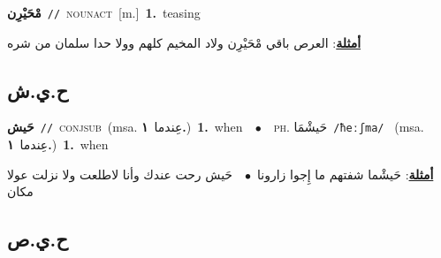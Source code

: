 \documentclass[10pt,a4paper,twoside]{article} %
\begin{document}
\begin{multicols}{2}
{\setlength\topsep{0pt}\textbf{\foreignlanguage{arabic}{مْحَيْرِن}}\ {\color{gray}\texttt{//}\color{black}}\ \textsc{noun\textunderscore act}\ [m.]\ \textbf{1.}~teasing\  \begin{flushright}\color{gray}\foreignlanguage{arabic}{\textbf{\underline{\foreignlanguage{arabic}{أمثلة}}}: العرص باقي مْحَيْرِن ولاد المخيم كلهم وولا حدا سلمان من شره}\end{flushright}\color{black}} \vspace{2mm}

\vspace{-3mm}
\subsection*{\color{blue}\foreignlanguage{arabic}{ح.ي.ش}\color{blue}{}} 

{\setlength\topsep{0pt}\textbf{\foreignlanguage{arabic}{حَيش}}\ {\color{gray}\texttt{//}\color{black}}\ \textsc{conj\textunderscore sub}\ \color{gray}(msa. \foreignlanguage{arabic}{عِندما}~\foreignlanguage{arabic}{\textbf{١.}})\color{black}\ \textbf{1.}~when\ \ $\bullet$\ \ \textsc{ph.} \color{gray} \foreignlanguage{arabic}{حَيشْمَا}\color{black}\ {\color{gray}\texttt{/{\sffamily ħeːʃma}/}\color{black}}\ \color{gray} (msa. \foreignlanguage{arabic}{عِندما}~\foreignlanguage{arabic}{\textbf{١.}})\color{black}\ \textbf{1.}~when\  \begin{flushright}\color{gray}\foreignlanguage{arabic}{\textbf{\underline{\foreignlanguage{arabic}{أمثلة}}}: حَيشْما شفتهم ما إِجوا زارونا\ $\bullet$\ \  حَيش رحت عندك وأنا لاطلعت ولا نزلت عولا مكان}\end{flushright}\color{black}} \vspace{2mm}

\vspace{-3mm}
\subsection*{\color{blue}\foreignlanguage{arabic}{ح.ي.ص}\color{blue}{}} 


\end{multicols}
\end{document}
